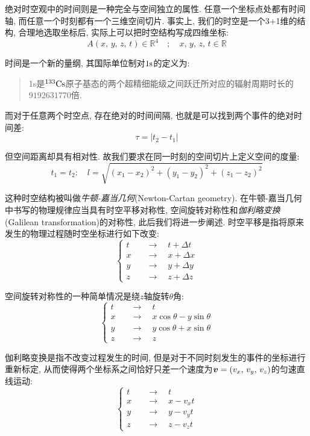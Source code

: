 绝对时空观中的时间则是一种完全与空间独立的属性. 任意一个坐标点处都有时间轴, 而任意一个时刻都有一个三维空间切片. 事实上, 我们的时空是一个3+1维的结构, 合理地选取坐标后, 实际上可以把时空结构写成四维坐标:
\[A(x,\,y,\,z,\,t)\in\mathbb{R}^4 \quad;\quad x,\,y,\,z,\,t\in\mathbb{R}\]

时间是一个新的量纲, 其国际单位制对$1{\rm s}$的定义为:
\begin{verse}\sf\large
\si{1s}是$^{133}{\rm Cs}$原子基态的两个超精细能级之间跃迁所对应的辐射周期时长的$9192631770$倍.
\end{verse}

而对于任意两个时空点, 存在绝对的时间间隔, 也就是可以找到两个事件的绝对时间差:
\[\tau=|t_2-t_1|\]

但空间距离却具有相对性. 故我们要求在同一时刻的空间切片上定义空间的度量:
\[t_1=t_2:\quad l=\sqrt{(x_1-x_2)^2+(y_1-y_2)^2+(z_1-z_2)^2}\]

这种时空结构被叫做\emph{牛顿-嘉当几何}(Newton-Cartan geometry). 在牛顿-嘉当几何中书写的物理规律应当具有时空平移对称性, 空间旋转对称性和\emph{伽利略变换}(Galilean transformation)的对称性, 此后我们将进一步阐述. 时空平移是指将原来发生的物理过程随时空坐标进行如下改变:
\[\begin{cases}t \quad &\longrightarrow \quad t+\Delta t\\x \quad &\longrightarrow \quad x+\Delta x\\y \quad &\longrightarrow \quad y+\Delta y\\z \quad &\longrightarrow \quad z+\Delta z \end{cases} \]

空间旋转对称性的一种简单情况是绕$z$轴旋转$\theta$角:
\[\begin{cases}t \quad &\longrightarrow \quad t\\x \quad &\longrightarrow \quad x\cos\theta-y\sin\theta\\y \quad &\longrightarrow \quad y\cos\theta+x\sin\theta\\z \quad &\longrightarrow \quad z\end{cases} \]

伽利略变换是指不改变过程发生的时间, 但是对于不同时刻发生的事件的坐标进行重新标定, 从而使得两个坐标系之间恰好只差一个速度为$\boldsymbol{v}=(v_x,\,v_y,\,v_z)$的匀速直线运动:
\[\begin{cases}t \quad &\longrightarrow \quad t\\x \quad &\longrightarrow \quad x-v_x t\\y \quad &\longrightarrow \quad y-v_y t\\z \quad &\longrightarrow \quad z-v_z t \end{cases} \]




